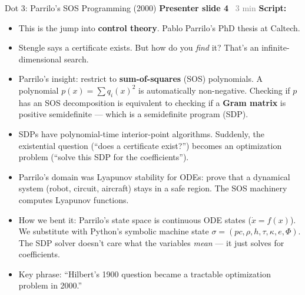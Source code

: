 \documentclass[aspectratio=169]{beamer}
\newcommand{\syncline}[2]{\textbf{#1} \hfill \textcolor{gray}{#2}}
\begin{document}
\begin{frame}{Dot 3: Parrilo's SOS Programming (2000)}
\syncline{Presenter slide 4}{~3 min}
\textbf{Script:}
\begin{itemize}
  \item This is the jump into \textbf{control theory}. Pablo Parrilo's PhD thesis at Caltech.
  \item Stengle says a certificate exists. But how do you \emph{find} it? That's an infinite-dimensional search.
  \item Parrilo's insight: restrict to \textbf{sum-of-squares} (SOS) polynomials. A polynomial $p(x) = \sum q_i(x)^2$ is automatically non-negative. Checking if $p$ has an SOS decomposition is equivalent to checking if a \textbf{Gram matrix} is positive semidefinite --- which is a semidefinite program (SDP).
  \item SDPs have polynomial-time interior-point algorithms. Suddenly, the existential question (``does a certificate exist?'') becomes an optimization problem (``solve this SDP for the coefficients'').
  \item Parrilo's domain was Lyapunov stability for ODEs: prove that a dynamical system (robot, circuit, aircraft) stays in a safe region. The SOS machinery computes Lyapunov functions.
  \item How we bent it: Parrilo's state space is continuous ODE states ($\dot{x} = f(x)$). We substitute with Python's symbolic machine state $\sigma = (pc, \rho, h, \tau, \kappa, e, \Phi)$. The SDP solver doesn't care what the variables \emph{mean} --- it just solves for coefficients.
  \item Key phrase: ``Hilbert's 1900 question became a tractable optimization problem in 2000.''
\end{itemize}
\end{frame}

\end{document}
